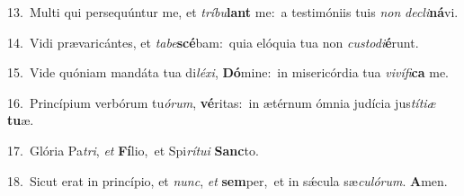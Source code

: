 {\numbfont\textcolor{\numbcolor}{13.}}~Multi qui persequúntur me, et \textit{trí}\-\textit{bu}\textbf{lant} me:~\star a testimóniis tuis \textit{non} \textit{de}\-\textit{cli}\textbf{ná}vi.\par
{\numbfont\textcolor{\numbcolor}{14.}}~Vidi prævaricántes, et \textit{ta}\-\textit{be}\textbf{scé}bam:~\star quia elóquia tua non \textit{cus}\-\textit{to}\textit{di}\textbf{é}runt.\par
{\numbfont\textcolor{\numbcolor}{15.}}~Vide quóniam mandáta tua di\-\textit{lé}\-\textit{xi}, \textbf{Dó}\-mine:~\star in misericórdia tua \textit{vi}\-\textit{ví}\textit{fi}\textbf{ca} me.\par
{\numbfont\textcolor{\numbcolor}{16.}}~Princípium verbórum tu\-\textit{ó}\-\textit{rum}, \textbf{vé}\-ritas:~\star in ætérnum ómnia judícia jus\-\textit{tí}\-\textit{ti}\textit{æ} \textbf{tu}\-æ.\par
{\numbfont\textcolor{\numbcolor}{17.}}~Glória Pa\-\textit{tri}\-, \textit{et} \textbf{Fí}\-lio,~\star et Spi\-\textit{rí}\-\textit{tu}\textit{i} \textbf{Sanc}\-to.\par
{\numbfont\textcolor{\numbcolor}{18.}}~Sicut erat in princípio, et \textit{nunc}\-, \textit{et} \textbf{sem}\-per,~\star et in sǽcula sæ\-\textit{cu}\-\textit{ló}\textit{rum}. \textbf{A}\-men.\par
